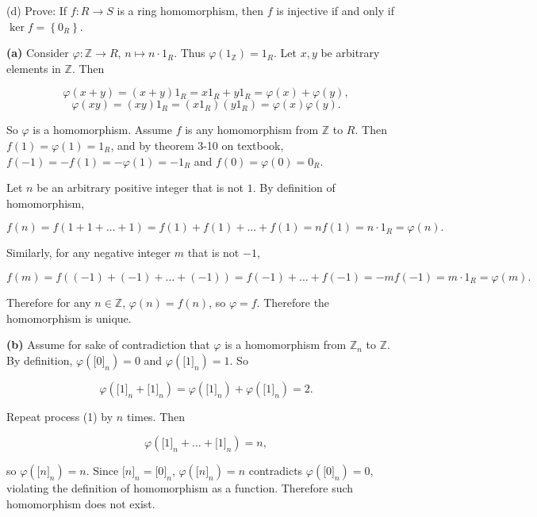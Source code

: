 (d) Prove: If \(f:R\rightarrow S\) is a ring homomorphism, then \(f\) is injective if and only if \(\ker f = \left\{ 0_{R} \right\}\).

\textbf{(a)} Consider \(\varphi:\mathbb{Z}\rightarrow R\), \(n\mapsto n \cdot 1_{R}\). Thus \(\varphi\left( 1_{\mathbb{Z}} \right) = 1_{R}\). Let \(x,y\) be arbitrary elements in \(\mathbb{Z}\). Then

\[\varphi\left( {x + y} \right) = \left( {x + y} \right)1_{R} = x1_{R} + y1_{R} = \varphi(x) + \varphi(y),\]\[\varphi\left( {xy} \right) = \left( {xy} \right)1_{R} = \left( {x1_{R}} \right)\left( {y1_{R}} \right) = \varphi(x)\varphi(y).\]

So \(\varphi\) is a homomorphism. Assume \(f\) is any homomorphism from \(\mathbb{Z}\) to \(R\). Then \(f(1) = \varphi(1) = 1_{R}\), and by theorem 3-10 on textbook, \(f\left( {- 1} \right) = - f(1) = - \varphi(1) = - 1_{R}\) and \(f(0) = \varphi(0) = 0_{R}\).

Let \(n\) be an arbitrary positive integer that is not \(1\). By definition of homomorphism,

\[f(n) = f\left( {1 + 1 + \ldots + 1} \right) = f(1) + f(1) + \ldots + f(1) = nf(1) = n \cdot 1_{R} = \varphi(n).\]

Similarly, for any negative integer \(m\) that is not \(- 1\),

\[f(m) = f\left( {\left( {- 1} \right) + \left( {- 1} \right) + \ldots + \left( {- 1} \right)} \right) = f\left( {- 1} \right) + \ldots + f\left( {- 1} \right) = - mf\left( {- 1} \right) = m \cdot 1_{R} = \varphi(m).\]

Therefore for any \(n \in \mathbb{Z}\), \(\varphi(n) = f(n)\), so \(\varphi = f\). Therefore the homomorphism is unique.

\textbf{(b)} Assume for sake of contradiction that \(\varphi\) is a homomorphism from \(\mathbb{Z}_{n}\) to \(\mathbb{Z}\). By definition, \(\varphi\left( \lbrack 0\rbrack_{n} \right) = 0\) and \(\varphi\left( \lbrack 1\rbrack_{n} \right) = 1\). So

\[\varphi\left( {\lbrack 1\rbrack_{n} + \lbrack 1\rbrack_{n}} \right) = \varphi\left( \lbrack 1\rbrack_{n} \right) + \varphi\left( \lbrack 1\rbrack_{n} \right) = 2.\]

Repeat process (1) by \(n\) times. Then

\[\varphi\left( {\lbrack 1\rbrack_{n} + \ldots + \lbrack 1\rbrack_{n}} \right) = n,\]

so \(\varphi\left( \lbrack n\rbrack_{n} \right) = n\). Since \(\lbrack n\rbrack_{n} = \lbrack 0\rbrack_{n}\), \(\varphi\left( \lbrack n\rbrack_{n} \right) = n\) contradicts \(\varphi\left( \lbrack 0\rbrack_{n} \right) = 0\), violating the definition of homomorphism as a function. Therefore such homomorphism does not exist.

